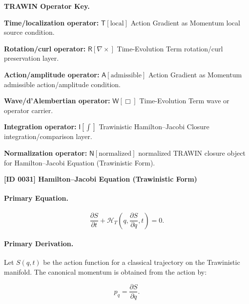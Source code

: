 \par\vspace{0.45\baselineskip}
\noindent\begin{minipage}[t]{\linewidth}
\begingroup
\small
\raggedright
\textbf{TRAWIN Operator Key.}\par
\noindent\textbf{Time/localization operator:} $\mathsf{T}\!\left[\mathrm{local}\right]$ Action Gradient as Momentum local source condition.\par
\noindent\textbf{Rotation/curl operator:} $\mathsf{R}\!\left[\nabla\times\right]$ Time-Evolution Term rotation/curl preservation layer.\par
\noindent\textbf{Action/amplitude operator:} $\mathsf{A}\!\left[\mathrm{admissible}\right]$ Action Gradient as Momentum admissible action/amplitude condition.\par
\noindent\textbf{Wave/d'Alembertian operator:} $\mathsf{W}\!\left[\Box\right]$ Time-Evolution Term wave or operator carrier.\par
\noindent\textbf{Integration operator:} $\mathsf{I}\!\left[\int\right]$ Trawinistic Hamilton--Jacobi Closure integration/comparison layer.\par
\noindent\textbf{Normalization operator:} $\mathsf{N}\!\left[\mathrm{normalized}\right]$ normalized TRAWIN closure object for Hamilton--Jacobi Equation (Trawinistic Form).\par
\endgroup
\end{minipage}

\clearpage
\noindent\textbf{[ID 0031] Hamilton--Jacobi Equation (Trawinistic Form)}\par
\vspace{0.35em}
\paragraph{Primary Equation.}
\begin{equation}
\frac{\partial S}{\partial t}
+
\mathcal{H}_T
\left(
q,\frac{\partial S}{\partial q},t
\right)
=
0 .
\end{equation}

\paragraph{Primary Derivation.}
Let $S(q,t)$ be the action function for a classical trajectory on the Trawinistic manifold.  
The canonical momentum is obtained from the action by:

\begin{equation}
p_q=\frac{\partial S}{\partial q}.
\end{equation}

